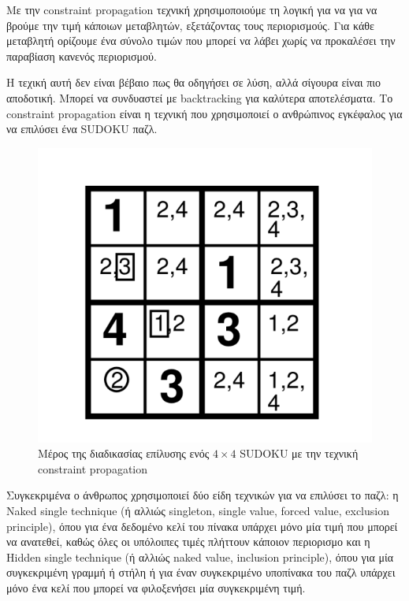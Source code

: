 \documentclass[12pt]{book}
\theoremstyle{definition}
\begin{document}
Με την constraint propagation τεχνική χρησιμοποιούμε τη λογική για να για να βρούμε την τιμή κάποιων μεταβλητών, εξετάζοντας τους περιορισμούς. Για κάθε μεταβλητή ορίζουμε ένα σύνολο τιμών που μπορεί να λάβει χωρίς να προκαλέσει την παραβίαση κανενός περιορισμού. \par

Η τεχική αυτή δεν είναι βέβαιο πως θα οδηγήσει σε λύση, αλλά σίγουρα είναι πιο αποδοτική. Μπορεί να συνδυαστεί με backtracking για καλύτερα αποτελέσματα. Το constraint propagation είναι η τεχνική που χρησιμοποιεί ο ανθρώπινος εγκέφαλος για να επιλύσει ένα SUDOKU παζλ. \par

\begin{figure}[h]
	\centering
	\includegraphics[scale=0.45]{Figures/propagation.png}
	\caption{Μέρος της διαδικασίας επίλυσης ενός \(4 \times 4\) SUDOKU με την τεχνική constraint propagation}
\end{figure}

Συγκεκριμένα ο άνθρωπος χρησιμοποιεί δύο είδη τεχνικών για να επιλύσει το παζλ: η Naked single technique (ή αλλιώς singleton, single value, forced value, exclusion
principle), όπου για ένα δεδομένο κελί του πίνακα υπάρχει μόνο μία τιμή που μπορεί να ανατεθεί, καθώς όλες οι υπόλοιπες τιμές πλήττουν κάποιον περιορισμο και η Hidden single technique (ή αλλιώς naked value, inclusion principle), όπου για μία συγκεκριμένη γραμμή ή στήλη ή για έναν συγκεκριμένο υποπίνακα του παζλ υπάρχει μόνο ένα κελί που μπορεί να φιλοξενήσει μία συγκεκριμένη τιμή. \par
\end{document}
